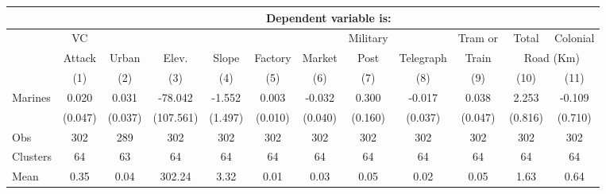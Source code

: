\begin{tabular}{lccccccccccc}
\hline  & \multicolumn{11}{c}{Dependent variable is:}\\
\hline  & VC &  &  &  &  &  & Military &  & Tram or & Total & Colonial\\
 & Attack & Urban & Elev. & Slope & Factory & Market & Post & Telegraph & Train & \multicolumn{2}{c}{Road (Km)}\\
 & (1) & (2) & (3) & (4) & (5) & (6) & (7) & (8) & (9) & (10) & (11)\\
\hline Marines & 0.020 & 0.031 & -78.042 & -1.552 & 0.003 & -0.032 & 0.300 & -0.017 & 0.038 & 2.253 & -0.109\\
 & (0.047) & (0.037) & (107.561) & (1.497) & (0.010) & (0.040) & (0.160) & (0.037) & (0.047) & (0.816) & (0.710)\\
Obs & 302 & 289 & 302 & 302 & 302 & 302 & 302 & 302 & 302 & 302 & 302\\
Clusters & 64  & 63  & 64  & 64  & 64  & 64  & 64  & 64  & 64  & 64  & 64 \\
Mean & 0.35 & 0.04 & 302.24 & 3.32 & 0.01 & 0.03 & 0.05 & 0.02 & 0.05 & 1.63 & 0.64\\
\hline\end{tabular}\\
